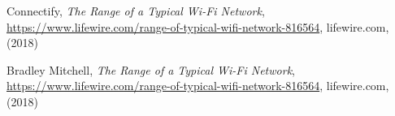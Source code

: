 \begin{thebibliography}{99}
%
 Connectify,
\emph{The Range of a Typical Wi-Fi Network}, \\
\url{https://www.lifewire.com/range-of-typical-wifi-network-816564}, lifewire.com, (2018)

%
 Bradley Mitchell,
\emph{The Range of a Typical Wi-Fi Network}, \\
\url{https://www.lifewire.com/range-of-typical-wifi-network-816564}, lifewire.com, (2018)

\end{thebibliography} 



